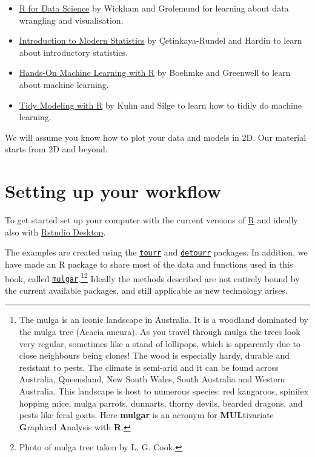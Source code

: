 \documentclass[
  letterpaper,
]{krantz}
\providecommand{\tightlist}{%
  \setlength{\itemsep}{0pt}\setlength{\parskip}{0pt}}\usepackage{longtable,booktabs,array}
\begin{document}
\begin{itemize}
\tightlist
\item
  \href{https://r4ds.had.co.nz}{R for Data Science} by Wickham and
  Grolemund for learning about data wrangling and visualisation.
\item
  \href{https://openintro-ims.netlify.app}{Introduction to Modern
  Statistics} by Çetinkaya-Rundel and Hardin to learn about introductory
  statistics.
\item
  \href{https://bradleyboehmke.github.io/HOML/}{Hands-On Machine
  Learning with R} by Boehmke and Greenwell to learn about machine
  learning.
\item
  \href{https://www.tmwr.org}{Tidy Modeling with R} by Kuhn and Silge to
  learn how to tidily do machine learning.
\end{itemize}

We will assume you know how to plot your data and models in 2D. Our
material starts from 2D and beyond.

\section*{Setting up your workflow}\label{setting-up-your-workflow}


To get started set up your computer with the current versions of
\href{https://cran.r-project.org}{R} and ideally also with
\href{https://posit.co/download/rstudio-desktop/}{Rstudio Desktop}.

The examples are created using the
\href{http://ggobi.github.io/tourr/}{\texttt{tourr}} and
\href{https://casperhart.github.io/detourr/}{\texttt{detourr}} packages.
In addition, we have made an R package to share most of the data and
functions used in this book, called
\href{http://dicook.github.io/mulgar}{\texttt{mulgar}}.\footnote{The
  mulga is an iconic landscape in Australia. It is a woodland dominated
  by the mulga tree (Acacia aneura). As you travel through mulga the
  trees look very regular, sometimes like a stand of lollipops, which is
  apparently due to close neighbours being clones! The wood is
  especially hardy, durable and resistant to pests. The climate is
  semi-arid and it can be found across Australia, Queensland, New South
  Wales, South Australia and Western Australia. This landscape is host
  to numerous species: red kangaroos, spinifex hopping mice, mulga
  parrots, dunnarts, thorny devils, bearded dragons, and pests like
  feral goats. Here \textbf{mulgar} is an acronym for
  \textbf{MUL}tivariate \textbf{G}raphical \textbf{A}nalysis with
  \textbf{R}.}\footnote{Photo of mulga tree taken by L. G. Cook.}
Ideally the methods described are not entirely bound by the current
available packages, and still applicable as new technology arises.
\end{document}
